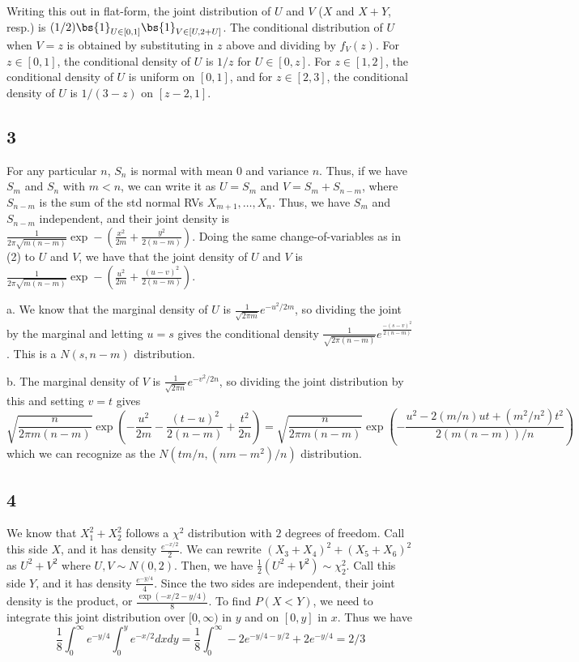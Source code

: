 \documentclass{article}
\begin{document}
Writing this out in flat-form, the joint distribution of $U$ and $V$ ($X$ and $X+Y$, resp.) is $(1/2)\bs{1}_{U\in[0,1]}\bs{1}_{V\in[U,2+U]}$. The conditional distribution of $U$ when $V=z$ is obtained by substituting in $z$ above and dividing by $f_V(z)$. For $z\in[0,1]$, the conditional density of $U$ is $1/z$ for $U\in[0,z]$. For $z\in[1,2]$, the conditional density of $U$ is uniform on $[0,1]$, and for $z\in[2,3]$, the conditional density of $U$ is $1/(3-z)$ on $[z-2,1]$.
\subsection*{3}
For any particular $n$, $S_n$ is normal with mean $0$ and variance $n$. Thus, if we have $S_m$ and $S_n$ with $m<n$, we can write it as $U=S_m$ and $V=S_m+S_{n-m}$, where $S_{n-m}$ is the sum of the std normal RVs $X_{m+1},\ldots,X_n$. Thus, we have $S_m$ and $S_{n-m}$ independent, and their joint density is $\frac{1}{2\pi\sqrt{m(n-m)}}\exp-\left(\frac{x^2}{2m}+\frac{y^2}{2(n-m)}\right)$. Doing the same change-of-variables as in (2) to $U$ and $V$, we have that the joint density of $U$ and $V$ is $\frac{1}{2\pi\sqrt{m(n-m)}}\exp-\left(\frac{u^2}{2m}+\frac{(u-v)^2}{2(n-m)}\right)$. 

\noindent a. We know that the marginal density of $U$ is $\frac{1}{\sqrt{2\pi m}}e^{-u^2/2m}$, so dividing the joint by the marginal and letting $u=s$ gives the conditional density $\frac{1}{\sqrt{2\pi(n-m)}}e^{\frac{-(s-v)^2}{2(n-m)}}$. This is a $N(s,n-m)$ distribution.

\noindent b. The marginal density of $V$ is $\frac{1}{\sqrt{2\pi n}}e^{-v^2/2n}$, so dividing the joint distribution by this and setting $v=t$ gives 
$$\sqrt{\frac{n}{2\pi m(n-m)}}\exp\left(-\frac{u^2}{2m}-\frac{(t-u)^2}{2(n-m)}+\frac{t^2}{2n}\right)=\sqrt{\frac{n}{2\pi m(n-m)}}\exp\left(-\frac{u^2-2(m/n)ut+(m^2/n^2)t^2}{2(m(n-m))/n}\right)$$
which we can recognize as the $N(tm/n,(nm-m^2)/n)$ distribution.
\subsection*{4}
We know that $X_1^2+X_2^2$ follows a $\chi^2$ distribution with $2$ degrees of freedom. Call this side $X$, and it has density $\frac{e^{-x/2}}{2}$. We can rewrite $(X_3+X_4)^2+(X_5+X_6)^2$ as $U^2+V^2$ where $U,V\sim N(0,2)$. Then, we have $\frac{1}{2}(U^2+V^2)\sim\chi^2_2$. Call this side $Y$, and it has density $\frac{e^{-y/4}}{4}$. Since the two sides are independent, their joint density is the product, or $\frac{\exp(-x/2-y/4)}{8}$. To find $P(X<Y)$, we need to integrate this joint distribution over $[0,\infty)$ in $y$ and on $[0,y]$ in $x$. Thus we have
    $$\frac{1}{8}\int_0^\infty e^{-y/4}\int_0^ye^{-x/2}dxdy=\frac{1}{8}\int_0^\infty -2e^{-y/4-y/2}+2e^{-y/4}=2/3$$
\end{document}
